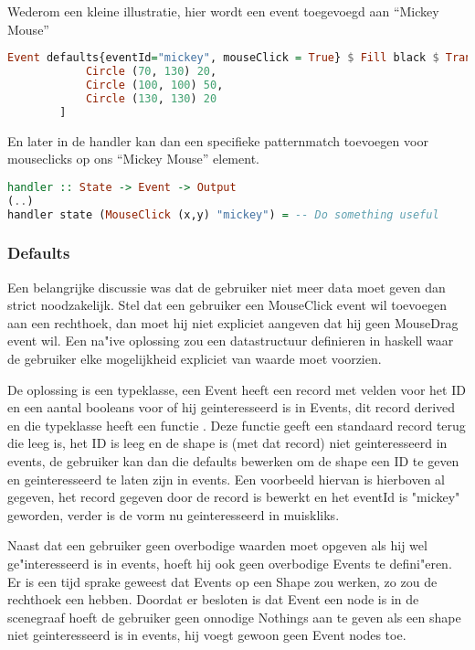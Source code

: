 Wederom een kleine illustratie, hier wordt een event toegevoegd aan ``Mickey Mouse''
\begin{lstlisting}[style=densecode, language=Haskell]
Event defaults{eventId="mickey", mouseClick = True} $ Fill black $ Translate 100 100 $ Rotate 90 $ Container 200 200 [
            Circle (70, 130) 20,
            Circle (100, 100) 50,
            Circle (130, 130) 20
        ]
\end{lstlisting}

En later in de handler kan dan een specifieke patternmatch toevoegen voor mouseclicks op ons ``Mickey Mouse'' element.
\begin{lstlisting}[style=densecode, language=Haskell]
handler :: State -> Event -> Output
(..)
handler state (MouseClick (x,y) "mickey") = -- Do something useful
\end{lstlisting}

\subsubsection{Defaults}
Een belangrijke discussie was dat de gebruiker niet meer data moet geven dan strict noodzakelijk. Stel dat een gebruiker een MouseClick event wil toevoegen aan een rechthoek, dan moet hij niet expliciet aangeven dat hij geen MouseDrag event wil. Een na"ive oplossing zou een datastructuur definieren in haskell waar de gebruiker elke mogelijkheid expliciet van waarde moet voorzien.

De oplossing is een  typeklasse, een Event heeft een record met velden voor het ID en een aantal booleans voor of hij geinteresseerd is in Events, dit record derived  en die typeklasse heeft een functie . Deze functie geeft een standaard record terug die leeg is, het ID is leeg en de shape is (met dat record) niet geinteresseerd in events, de gebruiker kan dan die defaults bewerken om de shape een ID te geven en geinteresseerd te laten zijn in events. Een voorbeeld hiervan is hierboven al gegeven, het record gegeven door de  record is bewerkt en het eventId is "mickey" geworden, verder is de vorm nu geinteresseerd in muiskliks.

Naast dat een gebruiker geen overbodige waarden moet opgeven als hij wel ge"interesseerd is in events, hoeft hij ook geen overbodige Events te defini"eren. Er is een tijd sprake geweest dat Events op een Shape zou werken, zo zou de rechthoek een  hebben. Doordat er besloten is dat Event een node is in de scenegraaf hoeft de gebruiker geen onnodige Nothings aan te geven als een shape niet geinteresseerd is in events, hij voegt gewoon geen Event nodes toe.

